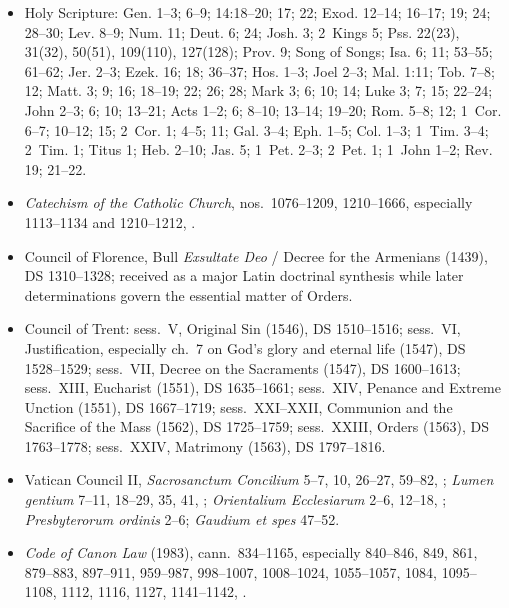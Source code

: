 {\footnotesize
\begin{itemize}[itemsep=0.18em,topsep=0.25em]
\item Holy Scripture: Gen. 1--3; 6--9; 14:18--20; 17; 22; Exod. 12--14; 16--17; 19; 24; 28--30; Lev. 8--9; Num. 11; Deut. 6; 24; Josh. 3; 2~Kings 5; Pss. 22(23), 31(32), 50(51), 109(110), 127(128); Prov. 9; Song of Songs; Isa. 6; 11; 53--55; 61--62; Jer. 2--3; Ezek. 16; 18; 36--37; Hos. 1--3; Joel 2--3; Mal. 1:11; Tob. 7--8; 12; Matt. 3; 9; 16; 18--19; 22; 26; 28; Mark 3; 6; 10; 14; Luke 3; 7; 15; 22--24; John 2--3; 6; 10; 13--21; Acts 1--2; 6; 8--10; 13--14; 19--20; Rom. 5--8; 12; 1~Cor. 6--7; 10--12; 15; 2~Cor. 1; 4--5; 11; Gal. 3--4; Eph. 1--5; Col. 1--3; 1~Tim. 3--4; 2~Tim. 1; Titus 1; Heb. 2--10; Jas. 5; 1~Pet. 2--3; 2~Pet. 1; 1~John 1--2; Rev. 19; 21--22.
\item \emph{Catechism of the Catholic Church}, nos.~1076--1209, 1210--1666, especially 1113--1134 and 1210--1212, .
\item Council of Florence, Bull \emph{Exsultate Deo} / Decree for the Armenians (1439), DS 1310--1328; received as a major Latin doctrinal synthesis while later determinations govern the essential matter of Orders.
\item Council of Trent: sess.~V, Original Sin (1546), DS 1510--1516; sess.~VI, Justification, especially ch.~7 on God's glory and eternal life (1547), DS 1528--1529; sess.~VII, Decree on the Sacraments (1547), DS 1600--1613; sess.~XIII, Eucharist (1551), DS 1635--1661; sess.~XIV, Penance and Extreme Unction (1551), DS 1667--1719; sess.~XXI--XXII, Communion and the Sacrifice of the Mass (1562), DS 1725--1759; sess.~XXIII, Orders (1563), DS 1763--1778; sess.~XXIV, Matrimony (1563), DS 1797--1816.
\item Vatican Council II, \emph{Sacrosanctum Concilium} 5--7, 10, 26--27, 59--82, ; \emph{Lumen gentium} 7--11, 18--29, 35, 41, ; \emph{Orientalium Ecclesiarum} 2--6, 12--18, ; \emph{Presbyterorum ordinis} 2--6; \emph{Gaudium et spes} 47--52.
\item \emph{Code of Canon Law} (1983), cann.~834--1165, especially 840--846, 849, 861, 879--883, 897--911, 959--987, 998--1007, 1008--1024, 1055--1057, 1084, 1095--1108, 1112, 1116, 1127, 1141--1142, .

\end{itemize}}
